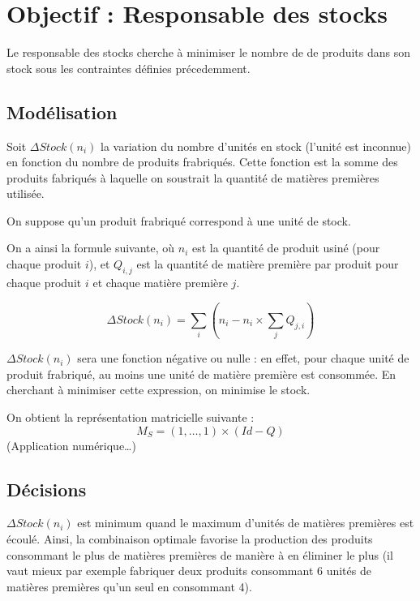 \newpage
\section{Objectif : Responsable des stocks}
Le responsable des stocks cherche à minimiser le nombre de de produits dans
son stock sous les contraintes définies précedemment.

\subsection{Modélisation}
Soit $\Delta Stock(n_{i})$ la variation du nombre d'unités en stock (l'unité est
inconnue) en fonction du nombre de produits frabriqués. Cette fonction est la
somme des produits fabriqués à laquelle on soustrait la quantité de matières
premières utilisée.

On suppose qu'un produit frabriqué correspond à une unité de stock.

On a ainsi la formule suivante, où $n_{i}$ est la quantité de produit usiné
(pour chaque produit $i$), et $Q_{i,j}$ est la quantité de matière première par
produit pour chaque produit $i$ et chaque matière première $j$.

\begin{equation}
	\Delta Stock(n_{i}) = \sum_{i} (n_{i} - n_{i} \times \sum_{j} Q_{j,i})
\end{equation}

$\Delta Stock(n_{i})$ sera une fonction négative ou nulle : en effet, pour
chaque unité de produit frabriqué, au moins une unité de matière première est
consommée. En cherchant à minimiser cette expression, on minimise le stock.

On obtient la représentation matricielle suivante :
\begin{equation}
	M_{S} = (1, \ldots, 1) \times (Id - Q)
\end{equation}
(Application numérique\ldots)

\subsection{Décisions}
$\Delta Stock(n_{i})$ est minimum quand le maximum d'unités de matières
premières est écoulé. Ainsi, la combinaison optimale favorise la production des
produits consommant le plus de matières premières de manière à en éliminer le
plus (il vaut mieux par exemple fabriquer deux produits consommant 6 unités de
matières premières qu'un seul en consommant 4).